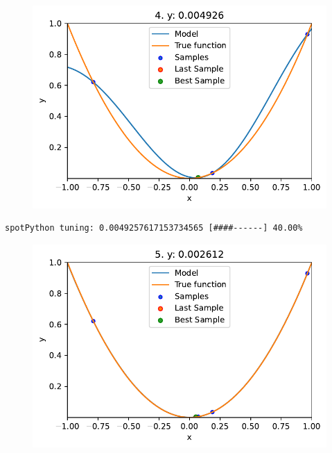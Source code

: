 \documentclass[
  letterpaper,
  DIV=11,
  numbers=noendperiod]{scrreprt}
\begin{document}
\begin{figure}[H]

{\centering \includegraphics{010_num_spot_sklearn_surrogate_files/figure-pdf/cell-25-output-2.pdf}

}

\end{figure}

\begin{verbatim}
spotPython tuning: 0.0049257617153734565 [####------] 40.00% 
\end{verbatim}

\begin{figure}[H]

{\centering \includegraphics{010_num_spot_sklearn_surrogate_files/figure-pdf/cell-25-output-4.pdf}

}

\end{figure}
\end{document}
